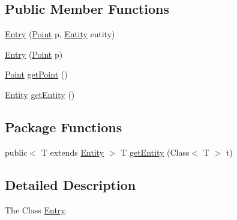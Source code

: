 \subsection*{Public Member Functions}
\begin{DoxyCompactItemize}
\item 
\hyperlink{classjdungeon_1_1core_1_1world_1_1filter_1_1_entry_a62bd9afde43771abdf548a7455315d38}{Entry} (\hyperlink{classjdungeon_1_1core_1_1world_1_1_point}{Point} p, \hyperlink{classjdungeon_1_1core_1_1world_1_1_entity}{Entity} entity)
\item 
\hyperlink{classjdungeon_1_1core_1_1world_1_1filter_1_1_entry_a7050332d06f99d495267102e82dba477}{Entry} (\hyperlink{classjdungeon_1_1core_1_1world_1_1_point}{Point} p)
\item 
\hyperlink{classjdungeon_1_1core_1_1world_1_1_point}{Point} \hyperlink{classjdungeon_1_1core_1_1world_1_1filter_1_1_entry_ae9bd8b8a15f341de510f60233621101c}{getPoint} ()
\item 
\hyperlink{classjdungeon_1_1core_1_1world_1_1_entity}{Entity} \hyperlink{classjdungeon_1_1core_1_1world_1_1filter_1_1_entry_a26ff411e33fc77161537a1b6608f7fd1}{getEntity} ()
\end{DoxyCompactItemize}
\subsection*{Package Functions}
\begin{DoxyCompactItemize}
\item 
public$<$ T extends \hyperlink{classjdungeon_1_1core_1_1world_1_1_entity}{Entity} $>$ T \hyperlink{classjdungeon_1_1core_1_1world_1_1filter_1_1_entry_a3b2251196af6a72e77f9c9eeda6f8643}{getEntity} (Class$<$ T $>$ t)
\end{DoxyCompactItemize}


\subsection{Detailed Description}
The Class \hyperlink{classjdungeon_1_1core_1_1world_1_1filter_1_1_entry}{Entry}. 

